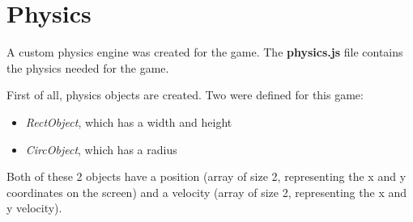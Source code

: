 \chapter{Physics}
A custom physics engine was created for the game. The \textbf{physics.js} file contains the physics needed for the game.

First of all, physics objects are created. Two were defined for this game:
\begin{itemize}
	\item \textit{RectObject}, which has a width and height
	\item \textit{CircObject}, which has a radius
\end{itemize}
Both of these 2 objects have a position (array of size 2, representing the x and y coordinates on the screen) and a velocity (array of size 2, representing the x and y velocity).

